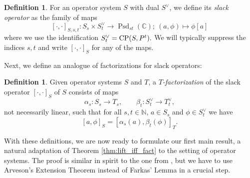 \documentclass[11pt,onecolumn]{article}
\theoremstyle{plain}
\theoremstyle{definition}
\newtheorem{definition}[theorem]{Definition}
\newcommand{\N}{\mathbb{N}}
\begin{document}
\begin{definition}
    For an operator system \(S\) with dual \(S^\lor\), we define its \textit{slack operator} as the family of maps \[[\cdot,\cdot ]_{S,s,t}\colon S_s \times S^\lor_t \to \operatorname{Psd}_{st}(\mathbb C);\  (a, \phi) \mapsto \phi[a]\] where we use the identification
    $S^\vee_t={\rm CP}(S,P^t).$  We will typically suppress the indices \(s, t\) and write $[\cdot,\cdot]_S$ for any of the maps.
\end{definition}

Next, we define an analogue of factorizations for slack operators:

\begin{definition}
	Given operator systems \(S\) and \(T\), a {\it $T$-factorization} of the slack operator $[\cdot,\cdot]_S$ of $S$ consists of maps \[\alpha_s\colon S_s \to T_s, \qquad \beta_t\colon S_t^\lor \to T_t^\lor,\] not necessarily linear,  such that for all \(s, t \in \N\), \(a \in S_s\) and \(\phi \in S^\lor_t\) we have \[ [a, \phi]_S = [\alpha_s(a),\beta_t(\phi)]_T .\] 
\end{definition}

With these definitions, we are now ready to formulate our first main result, a natural adaptation of Theorem \ref{thm:lift_iff_fact} to the setting of operator systems. The proof is similar in spirit to the one from \cite{GPT}, but we have to use Arveson's Extension Theorem instead of Farkas' Lemma in a crucial step.
\end{document}
